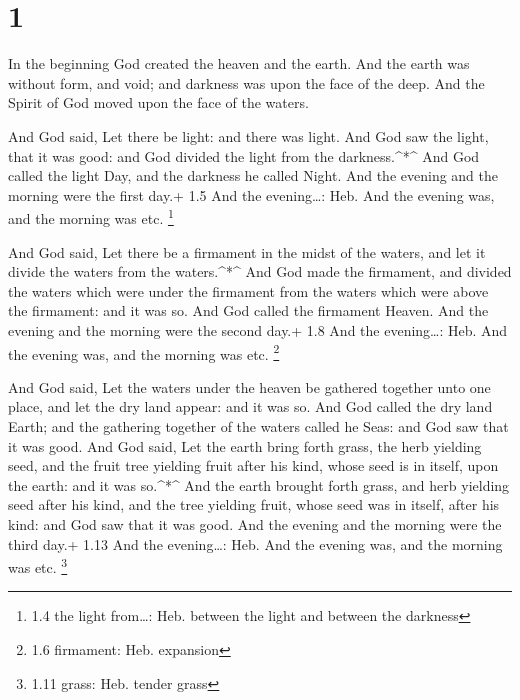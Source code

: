 \hypertarget{section}{%
\section{1}\label{section}}

 In the beginning God created the heaven and the earth.
 And the earth was without form, and void; and darkness was
upon the face of the deep. And the Spirit of God moved upon the face of
the waters.

 And God said, Let there be light: and there was light.
 And God saw the light, that it was good: and God divided
the light from the darkness.\^{}*\^{}  And God called the
light Day, and the darkness he called Night. And the evening and the
morning were the first day.+ 1.5 And the evening\ldots: Heb. And the
evening was, and the morning was etc. \footnote{1.4 the light
  from\ldots: Heb. between the light and between the darkness}

 And God said, Let there be a firmament in the midst of the
waters, and let it divide the waters from the waters.\^{}*\^{}
 And God made the firmament, and divided the waters which
were under the firmament from the waters which were above the firmament:
and it was so.  And God called the firmament Heaven. And the
evening and the morning were the second day.+ 1.8 And the evening\ldots:
Heb. And the evening was, and the morning was etc. \footnote{1.6
  firmament: Heb. expansion}

 And God said, Let the waters under the heaven be gathered
together unto one place, and let the dry land appear: and it was so.
 And God called the dry land Earth; and the gathering
together of the waters called he Seas: and God saw that it was good.
 And God said, Let the earth bring forth grass, the herb
yielding seed, and the fruit tree yielding fruit after his kind, whose
seed is in itself, upon the earth: and it was so.\^{}*\^{} 
And the earth brought forth grass, and herb yielding seed after his
kind, and the tree yielding fruit, whose seed was in itself, after his
kind: and God saw that it was good.  And the evening and
the morning were the third day.+ 1.13 And the evening\ldots: Heb. And
the evening was, and the morning was etc. \footnote{1.11 grass: Heb.
  tender grass}

